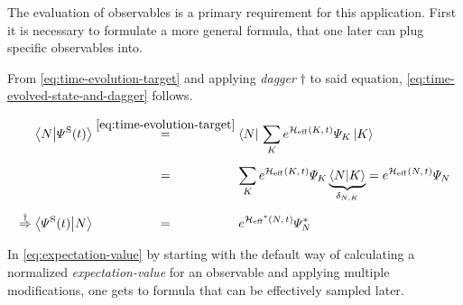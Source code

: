 The evaluation of observables is a primary requirement for this application. 
First it is necessary to formulate a more general formula, that one later can plug specific observables into.

From \autoref{eq:time-evolution-target} and applying \emph{dagger} $\dagger$ to said equation, \autoref{eq:time-evolved-state-and-dagger} follows.


\begin{equation}
    \label{eq:time-evolved-state-and-dagger}
    \begin{split}
        \braketHelper{N}{\psiOfT[\schroedingerPicture]} &\stackrel{\ref{eq:time-evolution-target}}{=} \braN{} \lsum[K] e^{\HeffOft[K]} \psiN[K] \ketN[K]{}\\
        & \stackrel{\phantom{\ref{eq:time-evolution-target}}}{=} 
        \lsum[K]   e^{\HeffOft[K]} \psiN[K] \underbrace{\braketHelper{N}{K}}_\text{$\delta_{N,K}$} = e^{\HeffOft} \psiN{} \\
        \stackrel{\dagger}{\Rightarrow} \braketHelper{\psiOfT[\schroedingerPicture]}{N} &\stackrel{\phantom{\ref{eq:time-evolution-target}}}{=} e^{\HeffOftStar} \psiNStar
    \end{split}
\end{equation}

In \autoref{eq:expectation-value} by starting with the default way of calculating a normalized \emph{expectation-value} for an observable \ObservableOp \cite{monteCarloObservableSampling} and applying multiple modifications, one gets to formula that can be effectively sampled later. 


